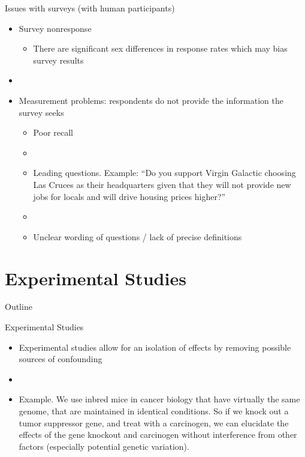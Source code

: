 \documentclass[xcolor=dvipsnames]{beamer}
\begin{document}
\begin{frame}{Issues with surveys (with human participants)}
\begin{itemize}
	\item Survey nonresponse \pause
	\begin{itemize}
		\item There are significant sex differences in response rates which may bias survey results \pause
	\end{itemize}
	\item[]
	\item Measurement problems: respondents do not provide the information the survey seeks \pause
	\begin{itemize}
		\item Poor recall \pause
		\item[]
		\item Leading questions. Example: ``Do you support Virgin Galactic choosing Las Cruces as their headquarters given that they will not provide new jobs for locals and will drive housing prices \pause higher?''
		\item[]
		\item Unclear wording of questions / lack of precise definitions 
	\end{itemize}
\end{itemize}
\end{frame}

\section{Experimental Studies}
\begin{frame}{Outline}
\tableofcontents[currentsection,subsectionstyle=show/shaded/hide]
\end{frame}
\begin{frame}{Experimental Studies}
	\begin{itemize}
		\item Experimental studies allow for an isolation of effects by removing possible sources of confounding \pause
		
		\item[]
		
		\item Example. We use inbred mice in cancer biology that have virtually the same genome, that are maintained in identical conditions. So if we knock out a tumor suppressor gene, and treat with a carcinogen, we can elucidate the effects of the gene knockout and carcinogen without interference from other factors (especially potential genetic variation).
		
	\end{itemize}
\end{frame}
\end{document}
